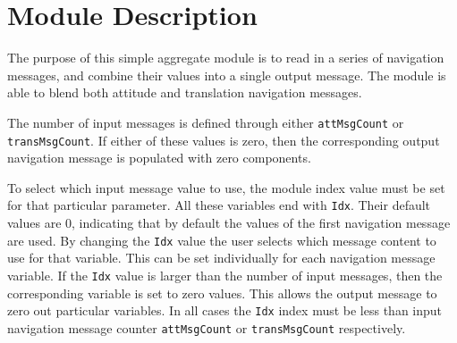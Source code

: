 
\section{Module Description}
The purpose of this simple aggregate module is to read in a series of navigation messages, and combine their values into a single output message.  The module is able to blend both attitude and translation navigation messages.   

The number of input messages is defined through either {\tt attMsgCount} or {\tt transMsgCount}.  If either of these values is zero, then the corresponding output navigation message is populated with zero components.  

To select which input message value to use, the module index value must be set for that particular parameter.  All these variables end with {\tt Idx}.  Their default values are 0, indicating that by default the values of the first navigation message are used.   By changing the {\tt Idx} value the user selects which message content to use for that variable.  This can be set individually for each navigation message variable.   If the {\tt Idx} value is larger than the number of input messages, then the corresponding variable is set to zero values.  This allows the output message to zero out particular variables.  In all cases the {\tt Idx} index must be less than input navigation message counter  {\tt attMsgCount} or {\tt transMsgCount} respectively.  
